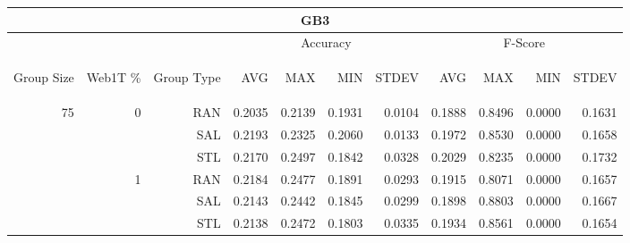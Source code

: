 \begin{center}
\begin{table}[htbp] 
 \begin{center}
\begin{tabular}{ | r | r | r | r | r | r | r | r | r | r | r |}
\hline
\multicolumn{11}{|c|}{GB3}\\
\hline
 & & & \multicolumn{4}{|c|}{Accuracy} & \multicolumn{4}{|c|}{F-Score}\\ \cline{4-11}
\begin{sideways}Group Size\end{sideways} & \begin{sideways}Web1T \%\end{sideways} & \begin{sideways}Group Type\end{sideways} & \begin{sideways}AVG\end{sideways} & \begin{sideways}MAX\end{sideways} & \begin{sideways}MIN\end{sideways} & \begin{sideways}STDEV\end{sideways} & \begin{sideways}AVG\end{sideways} & \begin{sideways}MAX\end{sideways} & \begin{sideways}MIN\end{sideways} & \begin{sideways}STDEV\end{sideways}\\
\hline
\multirow{12}{*}{75}
 & \multirow{3}{*}{0} & RAN & 0.2035 & 0.2139 & 0.1931 & 0.0104 & 0.1888 & 0.8496 & 0.0000 & 0.1631\\ \cline{3-11}
 &   & SAL & 0.2193 & 0.2325 & 0.2060 & 0.0133 & 0.1972 & 0.8530 & 0.0000 & 0.1658\\ \cline{3-11}
 &   & STL & 0.2170 & 0.2497 & 0.1842 & 0.0328 & 0.2029 & 0.8235 & 0.0000 & 0.1732\\ \cline{2-11}
 & \multirow{3}{*}{1} & RAN & 0.2184 & 0.2477 & 0.1891 & 0.0293 & 0.1915 & 0.8071 & 0.0000 & 0.1657\\ \cline{3-11}
 &   & SAL & 0.2143 & 0.2442 & 0.1845 & 0.0299 & 0.1898 & 0.8803 & 0.0000 & 0.1667\\ \cline{3-11}
 &   & STL & 0.2138 & 0.2472 & 0.1803 & 0.0335 & 0.1934 & 0.8561 & 0.0000 & 0.1654\\ \cline{2-11}

\end{tabular}
\end{center}
\end{table}
\end{center}
